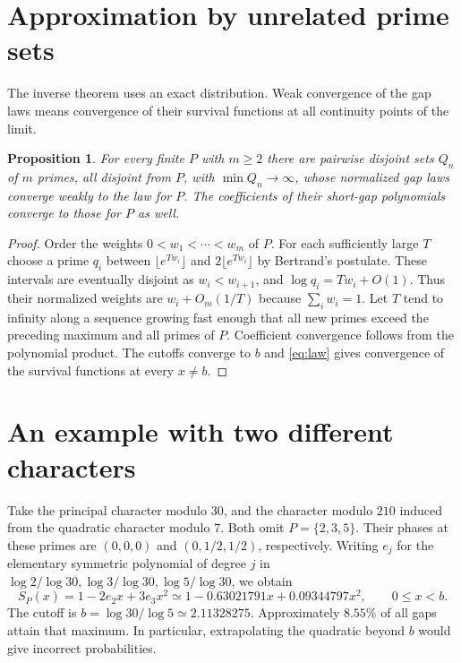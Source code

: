 \documentclass[11pt]{article}
\newtheorem{proposition}[theorem]{Proposition}
\begin{document}
\section{Approximation by unrelated prime sets}
The inverse theorem uses an exact distribution. Weak convergence of the gap laws means convergence of their survival functions at all continuity points of the limit.
\begin{proposition}\label{prop:instability}
For every finite $P$ with $m\ge2$ there are pairwise disjoint sets $Q_n$ of
$m$ primes, all disjoint from $P$, with $\min Q_n\to\infty$, whose normalized
gap laws converge weakly to the law for $P$. The coefficients of their
short-gap polynomials converge to those for $P$ as well.
\end{proposition}
\begin{proof}
Order the weights $0<w_1<\cdots<w_m$ of $P$. For each sufficiently large $T$
choose a prime $q_i$ between $\lfloor e^{Tw_i}\rfloor$ and
$2\lfloor e^{Tw_i}\rfloor$ by Bertrand's postulate. These intervals are
eventually disjoint as $w_i<w_{i+1}$, and $\log q_i=Tw_i+O(1)$. Thus their
normalized weights are $w_i+O_m(1/T)$ because $\sum_i w_i=1$. Let $T$ tend
to infinity along a sequence growing fast enough that all new primes exceed
the preceding maximum and all primes of $P$. Coefficient convergence follows
from the polynomial product. The cutoffs converge to $b$ and
\eqref{eq:law} gives convergence of the survival functions at every $x\ne b$.
\end{proof}

\section{An example with two different characters}
Take the principal character modulo $30$, and the character modulo $210$ induced
from the quadratic character modulo $7$. Both omit $P=\{2,3,5\}$. Their phases
at these primes are $(0,0,0)$ and $(0,1/2,1/2)$, respectively. Writing
$e_j$ for the elementary symmetric polynomial of degree $j$ in
$\log2/\log30,\log3/\log30,\log5/\log30$, we obtain
\[
 S_P(x)=1-2e_2x+3e_3x^2
 \simeq 1-0.63021791 x+0.09344797x^2,\qquad 0\le x<b.
\]
The cutoff is $b=\log30/\log5\simeq2.11328275$. Approximately
$8.55\%$ of all gaps attain that maximum. In particular, extrapolating the
quadratic beyond $b$ would give incorrect probabilities.
\end{document}
